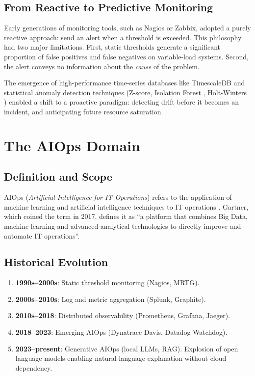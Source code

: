 \subsection{From Reactive to Predictive Monitoring}

Early generations of monitoring tools, such as Nagios or Zabbix, adopted a
purely reactive approach: send an alert when a threshold is exceeded. This
philosophy had two major limitations. First, static thresholds generate a
significant proportion of false positives and false negatives on variable-load
systems. Second, the alert conveys no information about the \textit{cause}
of the problem.

The emergence of high-performance time-series databases like TimescaleDB
\cite{timescaledb2017} and statistical anomaly detection techniques
(Z-score, Isolation Forest \cite{liu2008isolation}, Holt-Winters
\cite{winters1960forecasting}) enabled a shift to a proactive paradigm:
detecting drift before it becomes an incident, and anticipating future
resource saturation.

\section{The AIOps Domain}

\subsection{Definition and Scope}

AIOps (\textit{Artificial Intelligence for IT Operations}) refers to the
application of machine learning and artificial intelligence techniques to
IT operations \cite{gartner_aiops2021}. Gartner, which coined the term in 2017,
defines it as ``a platform that combines Big Data, machine learning and advanced
analytical technologies to directly improve and automate IT operations''.

\subsection{Historical Evolution}

\begin{enumerate}
  \item \textbf{1990s--2000s}: Static threshold monitoring (Nagios, MRTG).
  \item \textbf{2000s--2010s}: Log and metric aggregation (Splunk, Graphite).
  \item \textbf{2010s--2018}: Distributed observability (Prometheus, Grafana, Jaeger).
  \item \textbf{2018--2023}: Emerging AIOps (Dynatrace Davis, Datadog Watchdog).
  \item \textbf{2023--present}: Generative AIOps (local LLMs, RAG). Explosion
    of open language models enabling natural-language explanation without
    cloud dependency.
\end{enumerate}

